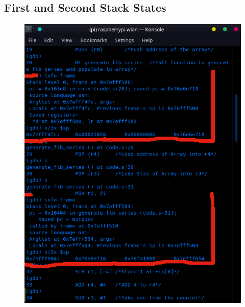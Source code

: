 \documentclass{article}
\begin{document}
	\subsection{First and Second Stack States}
	\begin{figure}[h!]
		\centering
		\includegraphics[width=\textwidth]{stack1_2.png}
	\end{figure}
	\newpage
\end{document}

